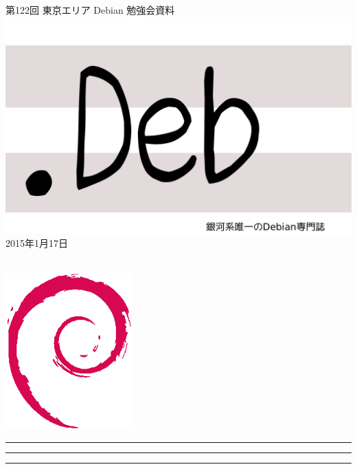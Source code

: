 \documentclass[mingoth,a4paper]{jsarticle}
\newcommand{\debmtgyear}{2015}
\newcommand{\debmtgmonth}{1}
\newcommand{\debmtgdate}{17}
\newcommand{\debmtgnumber}{122}
\begin{document}
\begin{titlepage}
\thispagestyle{empty}

\vspace*{-2cm}
第\debmtgnumber{}回 東京エリア Debian 勉強会資料\\
\hspace*{-2cm}
\includegraphics{image2012-natsu/dotdeb.pdf}\\
\hfill{}\debmtgyear{}年\debmtgmonth{}月\debmtgdate{}日

\\

\vspace*{-2cm}
\hfill{}\includegraphics[height=6cm]{image200502/openlogo-nd.eps}
\end{titlepage}

\newpage

\begin{minipage}[b]{0.2\hsize}
 \colorbox{titleback}{}
\end{minipage}
\begin{minipage}[b]{0.8\hsize}
\hrule
\vspace{2mm}
\hrule
\begin{multicols}{2}
\tableofcontents
\end{multicols}
\vspace{2mm}
\hrule
\end{minipage}
\end{document}
